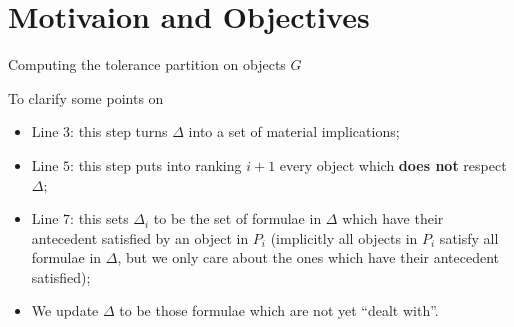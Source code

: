 \section{Motivaion and Objectives}
\label{section: motivation and objectives}

\begin{algorithm}
    \caption{Computing the tolerance partition on objects $G$}
\end{algorithm}

To clarify some points on
\begin{itemize}
    \item Line $3$: this step turns $\Delta$ into a set of material implications;
    \item Line $5$: this step puts into ranking $i+1$ every object which \textbf{does not} respect $\Delta$;
    \item Line $7$: this sets $\Delta_i$ to be the set of formulae in $\Delta$ which have their antecedent satisfied by an object in $P_i$ (implicitly all objects in $P_i$ satisfy all formulae in $\Delta$, but we only care about the ones which have their antecedent satisfied);
    \item We update $\Delta$ to be those formulae which are not yet ``dealt with''.
\end{itemize}

